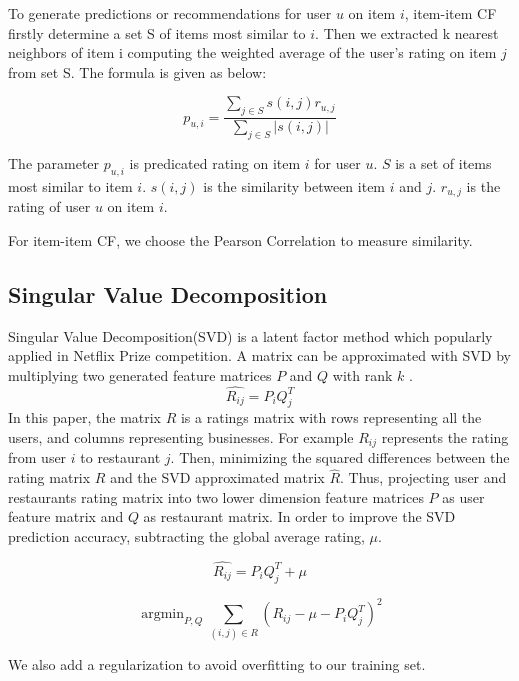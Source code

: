 \documentclass{llncs}
\DeclareMathOperator*{\argmin}{argmin}
\begin{document}
To generate predictions or recommendations for user $u$ on item $i$, item-item CF firstly determine a set S of items most similar to $i$. Then we extracted k nearest neighbors of item i computing the weighted average of the user's rating on item $j$ from set S. The formula is given as below:

\begin{equation}
p_{u,i} =\frac
{\sum\nolimits_{j \in S} s(i,j)r_{u,j}} 
{\sum\nolimits_{j \in S} |s(i,j)|}
\end{equation}

The parameter $p_{u,i}$ is predicated rating on item $i$ for user $u$. $S$ is a set of items most similar to item $i$. $s(i,j)$ is the similarity between item $i$ and $j$. $r_{u,j}$ is the rating of user $u$ on item $i$.

For item-item CF, we choose the Pearson Correlation to measure similarity. 


\subsection{Singular Value Decomposition}
Singular Value Decomposition(SVD) is a latent factor method which popularly applied in Netflix Prize competition. A matrix can be approximated with SVD by multiplying two generated feature matrices $P$ and $Q$ with rank $k$ \cite{Naomi}.
\begin{equation}
\hat{R_{ij}} = P_iQ_{j}^{T}
\end{equation}
In this paper, the matrix $R$ is a ratings matrix with rows representing all the users, and columns representing businesses. For example $R_{ij}$ represents the rating from user $i$ to restaurant $j$. Then, minimizing the squared differences between the rating matrix $R$ and the SVD approximated matrix $\hat{R}$. Thus, projecting user and restaurants rating matrix into two lower dimension feature matrices $P$ as user feature matrix and $Q$ as restaurant matrix. In order to improve the SVD prediction accuracy, subtracting the global average rating, $\mu$.

\begin{equation}
\hat{R_{ij}} = P_iQ_{j}^{T} + \mu
\end{equation}

\begin{equation}
\argmin_{P,Q}\sum_{(i,j)\in{R}}{(R_{ij} - \mu - P_iQ_{j}^{T})}^2
\end{equation}

We also add a regularization to avoid overfitting to our training set.
\end{document}

